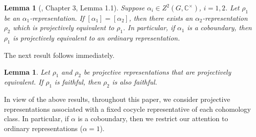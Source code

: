 \documentclass[a4paper,11pt]{amsart}
\numberwithin{equation}{section}
\numberwithin{equation}{subsection}
\newtheorem{lemma}[theorem]{Lemma}
\newcommand{\C}{\mathbb{C}}
\begin{document}

	
	\begin{lemma}[\cite{karpilovsky}, Chapter 3, Lemma 1.1] \label{projectively equivalent to an ordinary representation}
		Suppose $\alpha_i \in Z^2(G,\mathbb C^\times)$, $i=1,2$.
		Let $\rho_1$ be an $\alpha_1$-representation. If $[\alpha_1]= [\alpha_2]$, then there exists an $\alpha_2$-representation $\rho_2$ which is projectively equivalent to $\rho_1$. In particular, if $\alpha_1$ is a coboundary, then $\rho_1$ is projectively equivalent to an ordinary representation.
		
	\end{lemma}
	
	The next result follows immediately.
	\begin{lemma} \label{projectively equivalent} 
		Let $\rho_{1}$ and $\rho_{2}$ be projective representations that are projectively equivalent. If $\rho_{1}$ is faithful, then $\rho_{2}$ is also faithful.
	\end{lemma}
	
	
	
	In view of the above results, throughout this paper, we consider projective representations associated with a fixed cocycle representative of each cohomology class. In particular, if $\alpha$ is a coboundary, then we restrict our attention to ordinary representations ($\alpha=1$).
	
\end{document}
